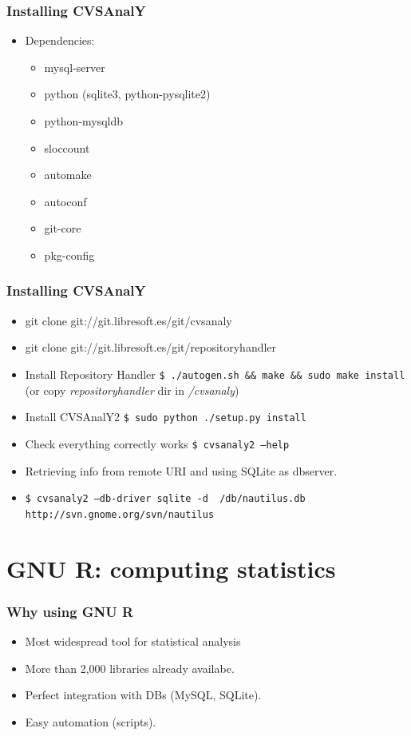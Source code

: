 \documentclass{beamer}
\begin{document}
\begin{frame}
\frametitle{Installing CVSAnalY}
 \begin{itemize}
 \item Dependencies:
 \begin{itemize}
  \item mysql-server
\item python (sqlite3, python-pysqlite2)
\item python-mysqldb
\item sloccount
\item automake
\item autoconf
\item git-core
\item pkg-config
 \end{itemize}
 \end{itemize}
\end{frame}

\begin{frame}
\frametitle{Installing CVSAnalY}
 \begin{itemize}
  \item git clone git://git.libresoft.es/git/cvsanaly
  \item git clone git://git.libresoft.es/git/repositoryhandler
  \item Install Repository Handler \texttt{\$ ./autogen.sh  \&\& make \&\& sudo make install} 
(or copy \textit{repositoryhandler} dir in \textit{/cvsanaly})
  \item Install CVSAnalY2 \texttt{\$ sudo python ./setup.py install}
  \item Check everything correctly works \texttt{\$ cvsanaly2 --help}
\item Retrieving info from remote URI and using SQLite as dbserver.
 \item \small \texttt{\$ cvsanaly2 --db-driver sqlite -d ~/db/nautilus.db \\}
\texttt{http://svn.gnome.org/svn/nautilus}
 \end{itemize}
\end{frame}

\section{GNU R: computing statistics}

\begin{frame}
\frametitle{Why using GNU R}
 \begin{itemize}
 \item Most widespread tool for statistical analysis
 \item More than 2,000 libraries already availabe.
 \item Perfect integration with DBs (MySQL, SQLite).
 \item Easy automation (scripts).
 \end{itemize}
\end{frame}
\end{document}
